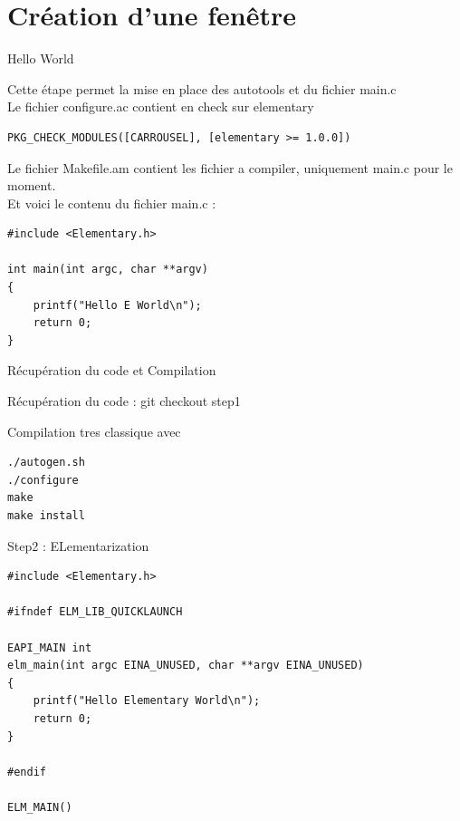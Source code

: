 \documentclass{beamer}
\begin{document}
\section{Création d'une fenêtre}
\begin{frame}[fragile]{Hello World}

Cette étape permet la mise en place des autotools et du fichier main.c\\
Le fichier configure.ac contient en check sur elementary
\begin{lstlisting}
PKG_CHECK_MODULES([CARROUSEL], [elementary >= 1.0.0])
\end{lstlisting}
Le fichier Makefile.am contient les fichier a compiler, uniquement main.c pour le moment.\\
Et voici le contenu du fichier main.c :
\begin{lstlisting}
#include <Elementary.h>

int main(int argc, char **argv)
{
    printf("Hello E World\n");
    return 0;
}
\end{lstlisting}
\end{frame}


\begin{frame}[fragile]{Récupération du code et Compilation}
\begin{block}{Récupération du code :}
git checkout step1
\end{block}
\begin{block}{Compilation tres classique avec}
\begin{verbatim}
./autogen.sh
./configure
make
make install
\end{verbatim}
\end{block}
\end{frame}

\begin{frame}[fragile]{Step2 : ELementarization}
\begin{lstlisting}
#include <Elementary.h>

#ifndef ELM_LIB_QUICKLAUNCH

EAPI_MAIN int
elm_main(int argc EINA_UNUSED, char **argv EINA_UNUSED)
{
    printf("Hello Elementary World\n");
    return 0;
}

#endif

ELM_MAIN()
\end{lstlisting}

\end{frame}
\end{document}
